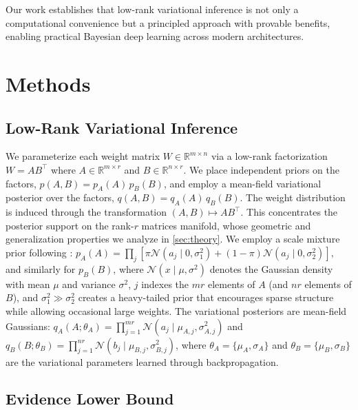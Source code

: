 \documentclass{article}
\theoremstyle{plain}
\theoremstyle{definition}
\theoremstyle{remark}
\begin{document}
Our work establishes that low-rank variational inference is not only a computational convenience but a principled approach with provable benefits, enabling practical Bayesian deep learning across modern architectures.



\section{Methods}
\label{sec:method}
\subsection{Low-Rank Variational Inference}
\label{sec:method:lowrank_vi}

We parameterize each weight matrix $W \in \mathbb{R}^{m \times n}$ via 
a low-rank factorization $W = AB^\top$ where $A \in \mathbb{R}^{m \times r}$ 
and $B \in \mathbb{R}^{n \times r}$. We place 
independent priors on the factors, $p(A,B) = p_A(A) \, p_B(B)$, and 
employ a mean-field variational posterior over the factors, 
$q(A,B) = q_A(A) \, q_B(B)$. The weight distribution is induced through 
the transformation $(A,B) \mapsto AB^\top$. %
This concentrates the posterior support on  the rank-$r$ matrices manifold, 
whose geometric and generalization properties we analyze in \cref{sec:theory}. We employ a scale mixture prior following \citet{blundell2015weight}: $
p_A(A) = \prod_{j}\left[\pi \mathcal{N}(a_j \mid 0, \sigma_1^2) + (1-\pi) \mathcal{N}(a_j \mid 0, \sigma_2^2)\right],
$
and similarly for $p_B(B)$, where $\mathcal{N}(x \mid \mu, \sigma^2)$ denotes the Gaussian density with mean $\mu$ and variance $\sigma^2$, $j$ indexes the $mr$ elements of $A$ (and $nr$ elements of $B$), and $\sigma_1^2 \gg \sigma_2^2$ creates a heavy-tailed prior that encourages sparse structure while allowing occasional large weights.
The variational posteriors are mean-field Gaussians: $q_A(A; \theta_A) = \prod_{j=1}^{mr} \mathcal{N}(a_j \mid \mu_{A,j}, \sigma_{A,j}^2)$ and $q_B(B; \theta_B) = \prod_{j=1}^{nr} \mathcal{N}(b_j \mid \mu_{B,j}, \sigma_{B,j}^2)$, where $\theta_A = \{\mu_A, \sigma_A\}$ and $\theta_B = \{\mu_B, \sigma_B\}$ are the variational parameters learned through backpropagation.
\subsection{Evidence Lower Bound %
}
\label{sec:method:elbo}
\end{document}
